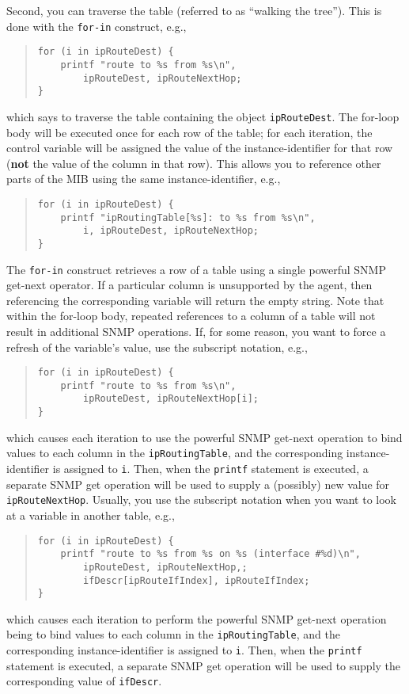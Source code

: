 Second,
you can traverse the table (referred to as ``walking the tree'').
This is done with the \verb"for-in" construct, e.g.,
\begin{quote}\small\begin{verbatim}
for (i in ipRouteDest) {
    printf "route to %s from %s\n",
        ipRouteDest, ipRouteNextHop;
}
\end{verbatim}\end{quote}
which says to traverse the table containing the object \verb"ipRouteDest".
The for-loop body will be executed once for each row of the table;
for each iteration,
the control variable will be assigned the value of the instance-identifier for
that row ({\bf not} the value of the column in that row).
This allows you to reference other parts of the MIB using the same
instance-identifier, e.g.,
\begin{quote}\small\begin{verbatim}
for (i in ipRouteDest) {
    printf "ipRoutingTable[%s]: to %s from %s\n",
        i, ipRouteDest, ipRouteNextHop;
}
\end{verbatim}\end{quote}

The \verb"for-in" construct retrieves a row of a table using a single powerful
SNMP get-next operator.
If a particular column is unsupported by the agent,
then referencing the corresponding variable will return the empty string.
Note that within the for-loop body,
repeated references to a column of a table will not result in additional SNMP
operations.
If, for some reason, you want to force a refresh of the variable's value,
use the subscript notation, e.g.,
\begin{quote}\small\begin{verbatim}
for (i in ipRouteDest) {
    printf "route to %s from %s\n",
        ipRouteDest, ipRouteNextHop[i];
}
\end{verbatim}\end{quote}
which causes each iteration to use the powerful SNMP get-next operation
to bind values to each column in the \verb"ipRoutingTable",
and the corresponding instance-identifier is assigned to \verb"i".
Then,
when the \verb"printf" statement is executed,
a separate SNMP get operation will be used to supply a (possibly) new value
for \verb"ipRouteNextHop".
Usually,
you use the subscript notation when you want to look at a variable in another
table, e.g.,
\begin{quote}\small\begin{verbatim}
for (i in ipRouteDest) {
    printf "route to %s from %s on %s (interface #%d)\n",
        ipRouteDest, ipRouteNextHop,;
        ifDescr[ipRouteIfIndex], ipRouteIfIndex;
}
\end{verbatim}\end{quote}
which causes each iteration to perform the powerful SNMP get-next operation
being to bind values to each column in the \verb"ipRoutingTable",
and the corresponding instance-identifier is assigned to \verb"i".
Then,
when the \verb"printf" statement is executed,
a separate SNMP get operation will be used to supply the corresponding value
of \verb"ifDescr".

